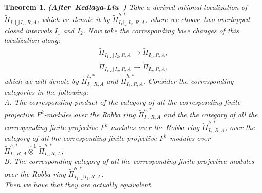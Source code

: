 \documentclass[12pt]{amsart}
\newtheorem{theorem}{Theorem}[section]
\theoremstyle{definition}
\numberwithin{equation}{section}
\begin{document}
\begin{theorem}\mbox{\bf{(After Kedlaya-Liu \cite[Theorem 4.6.1]{KL2})}}
Take a derived rational localization of $\widetilde{\Pi}_{I_1\bigcup I_2,R,A}$, which we denote it by $\widetilde{\Pi}^{h,*}_{I_1\bigcup I_2,R,A}$, where we choose two overlapped closed intervals $I_1$ and $I_2$. Now take the corresponding base changes of this localization along:
\begin{align}
\widetilde{\Pi}_{I_1\bigcup I_2,R,A}\rightarrow \widetilde{\Pi}_{I_1,R,A},\\
\widetilde{\Pi}_{I_1\bigcup I_2,R,A}\rightarrow \widetilde{\Pi}_{I_2,R,A},
\end{align}
which we will denote by $\widetilde{\Pi}^{h,*}_{I_1,R,A}$ and $\widetilde{\Pi}^{h,*}_{I_2,R,A}$. Consider the corresponding categories in the following:\\
A. The corresponding product of the category of all the corresponding finite projective $F^k$-modules over the Robba ring $\widetilde{\Pi}^{h,*}_{I_1,R,A}$ and the the category of all the corresponding finite projective $F^k$-modules over the Robba ring $\widetilde{\Pi}^{h,*}_{I_2,R,A}$, over the category of all the corresponding finite projective $F^k$-modules over $\widetilde{\Pi}^{h,*}_{I_1,R,A}\widehat{\otimes}^\mathbb{L}\widetilde{\Pi}^{h,*}_{I_2,R,A}$;\\
B. The corresponding category of all the corresponding finite projective modules over the Robba ring $\widetilde{\Pi}^{h,*}_{I_1\bigcup I_2,R,A}$.\\
Then we have that they are actually equivalent.


\end{theorem}
\end{document}
